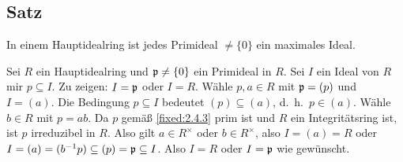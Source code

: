 \subsection{Satz} In einem Hauptidealring ist jedes Primideal $\neq \{0\}$ ein maximales Ideal.

\proof Sei $R$ ein Hauptidealring und $\mathfrak p \neq \{0\}$ ein Primideal in $R$. Sei $I$ ein Ideal von $R$ mir $p \subseteq I$. Zu zeigen: $I = \mathfrak p$ oder $I = R$. Wähle $p,a \in R$ mit $\mathfrak p = (p)$ und $I = (a)$. Die Bedingung $p \subseteq I$ bedeutet $(p) \subseteq (a)$, d.~h.~$p \in (a)$. Wähle $b \in R$ mit $p = ab$. Da $p$ gemäß \ref{fixed:2.4.3} prim ist und $R$ ein Integritätsring ist, ist $p$ irreduzibel in $R$. Also gilt $a \in R^\times$ oder $b \in R^\times$, also $I = (a) = R$ oder $I = (a) = (b^{-1} p) \subseteq (p) = \mathfrak p \subseteq I$. Also $I = R$ oder $I = \mathfrak p$ wie gewünscht.
